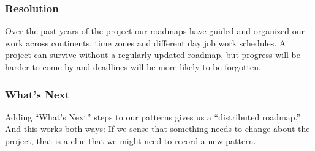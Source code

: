 \subsubsection*{Resolution}
Over the past years of the project our roadmaps have guided and organized our work across continents, time zones and different day job work schedules. A project can survive without a regularly updated roadmap, but progress will be harder to come by and deadlines will be more likely to be forgotten.

\subsubsection*{What's Next} 
Adding ``What's Next'' steps to our patterns gives us a ``distributed roadmap.''  And this works both ways: If we sense that something needs to change about the project, that is a clue that we might need to record a new pattern.

